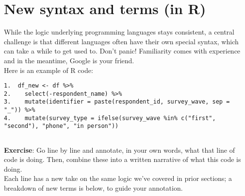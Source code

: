 \documentclass[
]{book}
\begin{document}
\section{New syntax and terms (in R)}\label{new-syntax-and-terms-in-r}

While the logic underlying programming languages stays consistent, a central challenge is that different languages often have their own special syntax, which can take a while to get used to. Don't panic! Familiarity comes with experience and in the meantime, Google is your friend.\\

Here is an example of R code:

\begin{verbatim}
1.  df_new <- df %>% 
2.    select(-respondent_name) %>% 
3.    mutate(identifier = paste(respondent_id, survey_wave, sep = "_")) %>% 
4.    mutate(survey_type = ifelse(survey_wave %in% c("first", "second"), "phone", "in person"))
  
\end{verbatim}

\textbf{Exercise}: Go line by line and annotate, in your own words, what that line of code is doing. Then, combine these into a written narrative of what this code is doing.\\

Each line has a new take on the same logic we've covered in prior sections; a breakdown of new terms is below, to guide your annotation.
\end{document}
